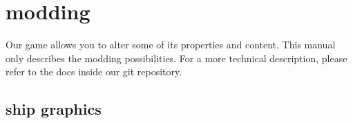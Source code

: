 \chapter*{modding}
Our game allows you to alter some of its properties and content. This manual only describes the modding possibilities. For a more technical description, please refer to the docs inside our git repository. 

\section*{ship graphics}
